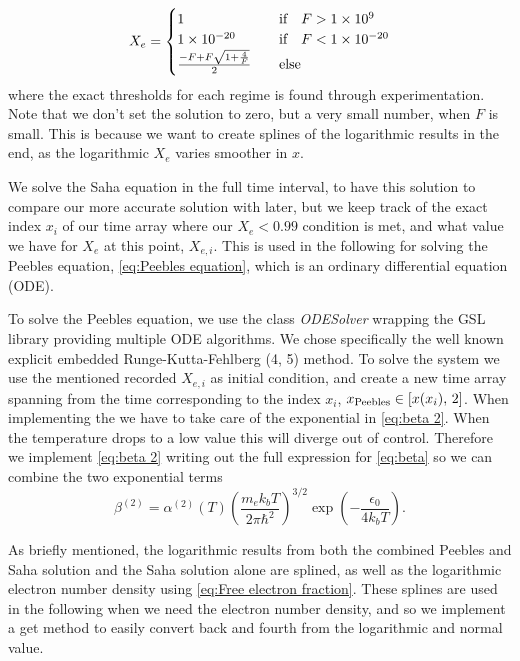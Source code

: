 \documentclass[10pt,a4paper]{article}
\begin{document}
\begin{align*}
    X_e = \begin{cases}
        \num{1} &\qif F > \num{1e9}
        \\
        \num{1e-20} &\qif F < \num{1e-20}
        \\
        \frac{-F + F\sqrt{1+\frac{4}{F}}}{2}  &\quad \text{else}
    \end{cases}
\end{align*}
where the exact thresholds for each regime is found through experimentation. Note that we don't set the solution to zero, but a very small number, when $F$ is small. This is because we want to create splines of the logarithmic results in the end, as the logarithmic $X_e$ varies smoother in $x$.

We solve the Saha equation in the full time interval, to have this solution to compare our more accurate solution with later, but we keep track of the exact index $x_i$ of our time array where our $X_e< 0.99$ condition is met, and what value we have for $X_e$ at this point, $X_{e,i}$. This is used in the following for solving the Peebles equation, \cref{eq:Peebles equation}, which is an ordinary differential equation (ODE).

To solve the Peebles equation, we use the class \textit{ODESolver} wrapping the GSL library providing multiple ODE algorithms. We chose specifically the well known explicit embedded Runge-Kutta-Fehlberg (4, 5) method\citep{gsl-doc}. To solve the system we use the mentioned recorded $X_{e,i}$ as initial condition, and create a new time array spanning from the time corresponding to the index $x_i$, $x_{\rm{Peebles}} \in \left[x(x_i),\, 2\right]$. When implementing the  we have to take care of the exponential in \cref{eq:beta 2}. When the temperature drops to a low value this will diverge out of control. Therefore we implement \cref{eq:beta 2} writing out the full expression for \cref{eq:beta} so we can combine the two exponential terms
\begin{equation*}
    \beta^{(2)} = \alpha^{(2)}(T) \left(\frac{m_e k_b T}{2\pi\hbar^2}\right)^{3/2} \exp(-\frac{\epsilon_0}{4k_b T}).
\end{equation*}

As briefly mentioned, the logarithmic results from both the combined Peebles and Saha solution and the Saha solution alone are splined, as well as the logarithmic electron number density using \cref{eq:Free electron fraction}. These splines are used in the following when we need the electron number density, and so we implement a get method to easily convert back and fourth from the logarithmic and normal value.
\end{document}
